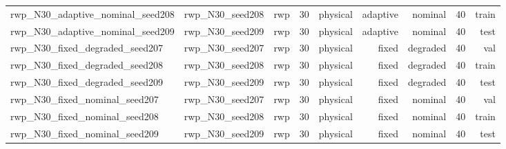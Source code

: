 \begin{tabular}{lrrrrrrrr}
rwp\_N30\_adaptive\_nominal\_seed208 & rwp\_N30\_seed208 & rwp & 30 & physical & adaptive & nominal & 40 & train \\
rwp\_N30\_adaptive\_nominal\_seed209 & rwp\_N30\_seed209 & rwp & 30 & physical & adaptive & nominal & 40 & test \\
rwp\_N30\_fixed\_degraded\_seed207 & rwp\_N30\_seed207 & rwp & 30 & physical & fixed & degraded & 40 & val \\
rwp\_N30\_fixed\_degraded\_seed208 & rwp\_N30\_seed208 & rwp & 30 & physical & fixed & degraded & 40 & train \\
rwp\_N30\_fixed\_degraded\_seed209 & rwp\_N30\_seed209 & rwp & 30 & physical & fixed & degraded & 40 & test \\
rwp\_N30\_fixed\_nominal\_seed207 & rwp\_N30\_seed207 & rwp & 30 & physical & fixed & nominal & 40 & val \\
rwp\_N30\_fixed\_nominal\_seed208 & rwp\_N30\_seed208 & rwp & 30 & physical & fixed & nominal & 40 & train \\
rwp\_N30\_fixed\_nominal\_seed209 & rwp\_N30\_seed209 & rwp & 30 & physical & fixed & nominal & 40 & test \\
\bottomrule
\end{tabular}